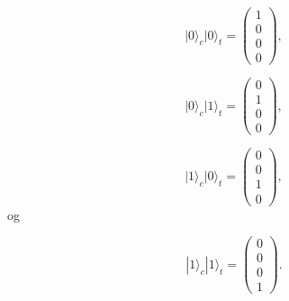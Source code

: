 \documentclass[%
oneside,                 %
final,                   %
10pt]{article}
\begin{document}
\begin{equation}
   \vert 0 \rangle_c\vert 0 \rangle_t=\left(\begin{array}{c} 1  \\ 
                                                 0  \\
                                                 0  \\
                                                 0  \end{array}\right),
\end{equation}

\begin{equation}
   \vert 0 \rangle_c|1\rangle_t=\left(\begin{array}{c} 0  \\ 
                                                 1  \\
                                                 0  \\
                                                 0  \end{array}\right),
\end{equation}

\begin{equation}
   |1\rangle_c\vert 0 \rangle_t=\left(\begin{array}{c} 0  \\ 
                                                 0  \\
                                                 1  \\
                                                 0  \end{array}\right),
\end{equation}
og

\begin{equation}
   |1\rangle_c|1\rangle_t=\left(\begin{array}{c} 0  \\ 
                                                 0  \\
                                                 0  \\
                                                 1  \end{array}\right).
\end{equation}
\end{document}
